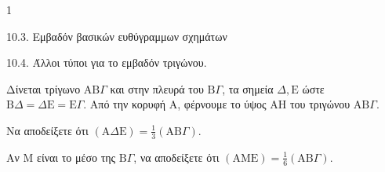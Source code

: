 \begin{ylh}{1}
    \item 10.3. Εμβαδόν βασικών ευθύγραμμων σχημάτων
    \item 10.4. Άλλοι τύποι για το εμβαδόν τριγώνου.
\end{ylh}
\begin{figure}
    \centering
\end{figure}
Δίνεται τρίγωνο $\text{AB}\Gamma$ και στην πλευρά του $\text{B}\Gamma$, τα σημεία $\Delta,\text{E}$ ώστε $\text{B}\Delta = \Delta\text{E} = \text{E}\Gamma$. Από την κορυφή $\text{A}$, φέρνουμε το ύψος $\text{AH}$ του τριγώνου $\text{AB}\Gamma$.
\begin{alist}
    \item Να αποδείξετε ότι $(\text{A}\Delta\text{E}) = \frac{1}{3} (\text{AB}\Gamma)$.  
    \item Αν $\text{M}$ είναι το μέσο της $\text{B}\Gamma$, να αποδείξετε ότι $(\text{AME}) = \frac{1}{6} (\text{AB}\Gamma)$.  
\end{alist}